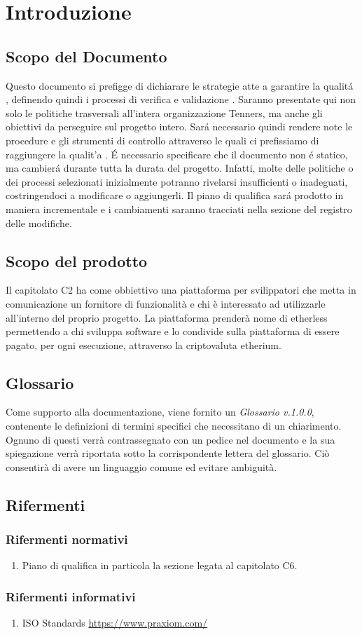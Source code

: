 \section{Introduzione}

\subsection{Scopo del Documento}
Questo documento si prefigge di dichiarare le strategie atte a garantire la qualit\'a \glo, definendo quindi i processi di verifica \glo e validazione \glo. Saranno presentate qui non solo le politiche trasversali all'intera organizzazione Tenners, ma anche gli obiettivi da perseguire sul progetto intero. Sar\'a necessario quindi rendere note le procedure e gli strumenti di controllo attraverso le quali ci prefissiamo di raggiungere la qualit'a \glo.
\'E necessario specificare che il documento non \'e statico, ma cambier\'a durante tutta la durata del progetto. Infatti, molte delle politiche o dei processi selezionati inizialmente potranno rivelarsi insufficienti o inadeguati, costringendoci a modificare o aggiungerli. Il piano di qualifica \glo sar\'a prodotto in maniera incrementale e i cambiamenti saranno tracciati nella sezione del registro delle modifiche.

\subsection{Scopo del prodotto}
Il capitolato C2 ha come obbiettivo una piattaforma per svilippatori che metta
in comunicazione un fornitore di funzionalit\`a e chi \`e interessato ad utilizzarle
all'interno del proprio progetto.
La piattaforma prender\`a nome di etherless permettendo a chi sviluppa software e
lo condivide sulla piattaforma di essere pagato, per ogni esecuzione, attraverso
la criptovaluta etherium.


\subsection{Glossario}
Come supporto alla documentazione, viene fornito un \textit{Glossario v.1.0.0},
contenente le definizioni di termini specifici che necessitano di un chiarimento.
Ognuno di questi verr\`a contrassegnato con un pedice \glo nel documento e la sua
spiegazione verr\`a riportata sotto la corrispondente lettera del glossario. Ci\`o
consentir\`a di avere un linguaggio comune ed evitare ambiguit\`a.

\subsection{Rifermenti}
\subsubsection{Rifermenti normativi}
\begin{enumerate}
  \item Piano di qualifica in particola la sezione legata al capitolato C6.
\end{enumerate}
\subsubsection{Rifermenti informativi}
\begin{enumerate}
  \item ISO Standards
	\url{https://www.praxiom.com/}
\end{enumerate}

